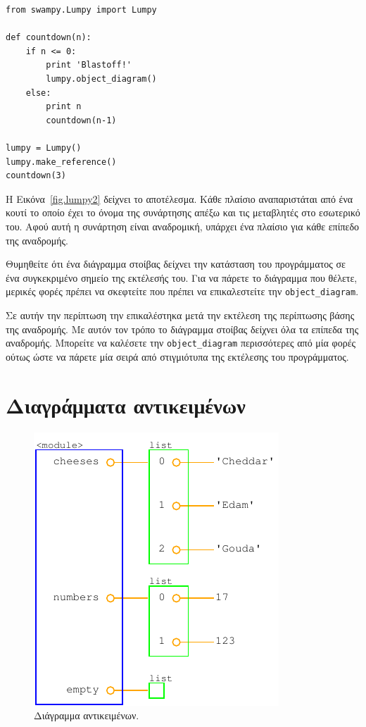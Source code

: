 \documentclass[10pt]{book}
\begin{document}
\begin{verbatim}
from swampy.Lumpy import Lumpy

def countdown(n):
    if n <= 0:
        print 'Blastoff!'
        lumpy.object_diagram()
    else:
        print n
        countdown(n-1)

lumpy = Lumpy()
lumpy.make_reference()
countdown(3)
\end{verbatim}

 Η Εικόνα~\ref{fig.lumpy2} δείχνει το αποτέλεσμα.  Κάθε πλαίσιο αναπαριστάται 
από ένα κουτί το οποίο έχει το όνομα της συνάρτησης απέξω και τις μεταβλητές στο 
εσωτερικό του.  Αφού αυτή η συνάρτηση είναι αναδρομική, υπάρχει ένα πλαίσιο για κάθε επίπεδο της αναδρομής.

Θυμηθείτε ότι ένα διάγραμμα στοίβας δείχνει την κατάσταση του προγράμματος σε ένα 
συγκεκριμένο σημείο της εκτέλεσής του.  Για να πάρετε το διάγραμμα που θέλετε, μερικές φορές πρέπει να σκεφτείτε που πρέπει να επικαλεστείτε την   
\verb"object_diagram".

 Σε αυτήν την περίπτωση την επικαλέστηκα μετά την εκτέλεση της περίπτωσης βάσης της αναδρομής.  Με αυτόν τον τρόπο το διάγραμμα στοίβας δείχνει όλα τα επίπεδα της αναδρομής.  Μπορείτε να καλέσετε την \verb"object_diagram" περισσότερες από μία φορές ούτως ώστε να πάρετε μία σειρά από στιγμιότυπα της εκτέλεσης του προγράμματος.


\section{Διαγράμματα αντικειμένων}

\begin{figure}
\centerline
{\includegraphics[scale=0.7]{figs/lumpydemo3.pdf}}
\caption{Διάγραμμα αντικειμένων.}
\label{fig.lumpy3}
\end{figure}
\end{document}

